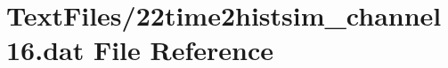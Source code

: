 \hypertarget{22time2histsim__channel16_8dat}{}\section{Text\+Files/22time2histsim\+\_\+channel16.dat File Reference}
\label{22time2histsim__channel16_8dat}
